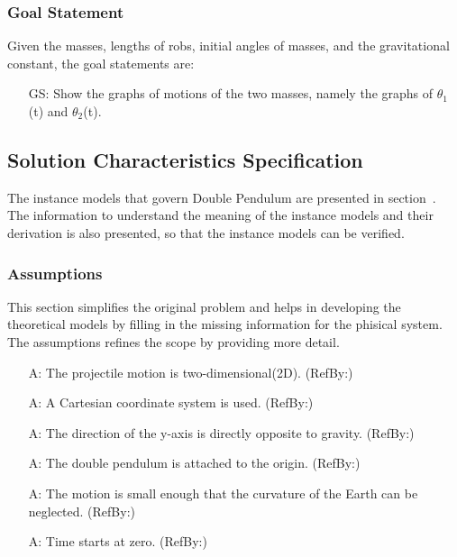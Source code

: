 \documentclass[12pt]{article}
\newcounter{assumpnum} %
\newcounter{goalnum} %
\begin{document}
\subsubsection{Goal Statement}\label{sec_goalState}
Given the masses, lengths of robs, initial angles of masses, and the gravitational constant, the goal statements are:
\begin{itemize}

\item[GS\refstepcounter{goalnum}\thegoalnum \label{G_meaningfulLabel}:] Show the graphs of motions of the two masses, namely the graphs of $\theta_1$(t) and $\theta_2$(t).
\end{itemize}

\subsection{Solution Characteristics Specification}\label{sec_solotionSpec}
The instance models that govern Double Pendulum are presented in section~. The information to understand the meaning of the instance models and their derivation is also presented, so that the instance models can be verified. 

\subsubsection{Assumptions}\label{sec_assumpt}
This section simplifies the original problem and helps in developing the theoretical models by filling in the missing information for the phisical system. The assumptions refines the scope by providing more detail.
\begin{itemize}

\item[A\refstepcounter{assumpnum}\theassumpnum \label{A_2D}:]
The projectile motion is two-dimensional(2D). (RefBy:)
\item[A\refstepcounter{assumpnum}\theassumpnum \label{A_cartSys}:]
A Cartesian coordinate system is used. (RefBy:)
\item[A\refstepcounter{assumpnum}\theassumpnum \label{A_yGravity}:]
The direction of the y-axis is directly opposite to gravity. (RefBy:)
\item[A\refstepcounter{assumpnum}\theassumpnum \label{A_origin}:]
The double pendulum is attached to the origin. (RefBy:)
\item[A\refstepcounter{assumpnum}\theassumpnum \label{A_neglectCurve}:]
The motion is small enough that the curvature of the Earth can be neglected. (RefBy:)
\item[A\refstepcounter{assumpnum}\theassumpnum \label{A_timeZero}:]
Time starts at zero. (RefBy:)

\end{itemize}
\end{document}
